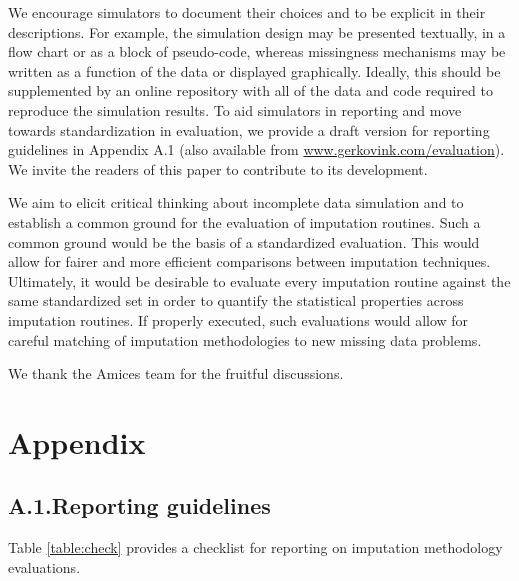 \documentclass[bimj,fleqn]{w-art}
\begin{document}
We encourage simulators to document their choices and to be explicit in their descriptions. For example, the simulation design may be presented textually, in a flow chart or as a block of pseudo-code, whereas missingness mechanisms may be written as a function of the data or displayed graphically. Ideally, this should be supplemented by an online repository with all of the data and code required to reproduce the simulation results. To aid simulators in reporting and move towards standardization in evaluation, we provide a draft version for reporting guidelines in Appendix A.1 (also available from \underline{www.gerkovink.com/evaluation}). We invite the readers of this paper to contribute to its development. 

We aim to elicit critical thinking about incomplete data simulation and to establish a common ground for the evaluation of imputation routines. Such a common ground would be the basis of a standardized evaluation. This would allow for fairer and more efficient comparisons between imputation techniques. Ultimately, it would be desirable to evaluate every imputation routine against the same standardized set in order to quantify the statistical properties across imputation routines. If properly executed, such evaluations would allow for careful matching of imputation methodologies to new missing data problems. 



\begin{acknowledgement}
We thank the Amices team for the fruitful discussions.
\end{acknowledgement}
\vspace*{1pc}



\section*{Appendix}

\subsection*{A.1.\enspace Reporting guidelines}

Table \ref{table:check} provides a checklist for reporting on imputation methodology evaluations. 
\end{document}

